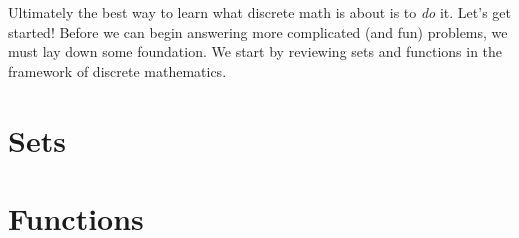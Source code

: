\documentclass[12pt]{article}
\def\righthead{Introduction} %
\begin{document}
Ultimately the best way to learn what discrete math is about is to {\em do} it.  Let's get started! Before we can begin answering more complicated (and fun) problems, we must lay down some foundation.  We start by reviewing sets and functions in the framework of discrete mathematics.

\section{Sets}
\def\righthead{Sets}


\section{Functions}
\def\righthead{Functions}



%
%
%
\end{document}
